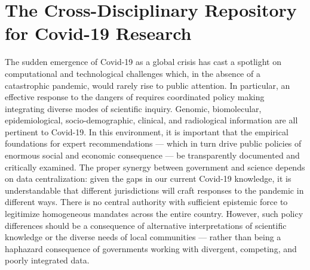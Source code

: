 \documentclass[11pt,letterpaper]{article}
\newcommand{\p}[1]{

\vspace{.7em}#1}
\begin{document}
{\section{The Cross-Disciplinary Repository for Covid-19 Research}
\p{The sudden emergence of Covid-19 as a global crisis has 
cast a spotlight on computational and technological challenges 
which, in the absence of a catastrophic pandemic, would 
rarely rise to public attention.  In particular, an effective 
response to the dangers of \makebox{SARS-CoV-2} requires coordinated 
policy making integrating diverse modes of scientific inquiry.  
Genomic, biomolecular, epidemiological, socio-demographic, clinical, 
and radiological information are all pertinent to Covid-19.  
In this environment, it is important that the 
empirical foundations for expert recommendations --- which 
in turn drive public policies of enormous social and 
economic consequence --- be transparently documented 
and critically examined.  The proper synergy between government 
and science depends on data centralization: given 
the gaps in our current Covid-19 knowledge, it is 
understandable that different jurisdictions will craft responses to 
the pandemic in different ways.  There is no central authority 
with sufficient epistemic force to legitimize homogeneous 
mandates across the entire country.  However, such 
policy differences should be a consequence of alternative interpretations of 
scientific knowledge or the diverse needs of local communities  
--- rather than being a haphazard consequence of governments 
working with divergent, competing, and poorly integrated data.}

}
\end{document}
